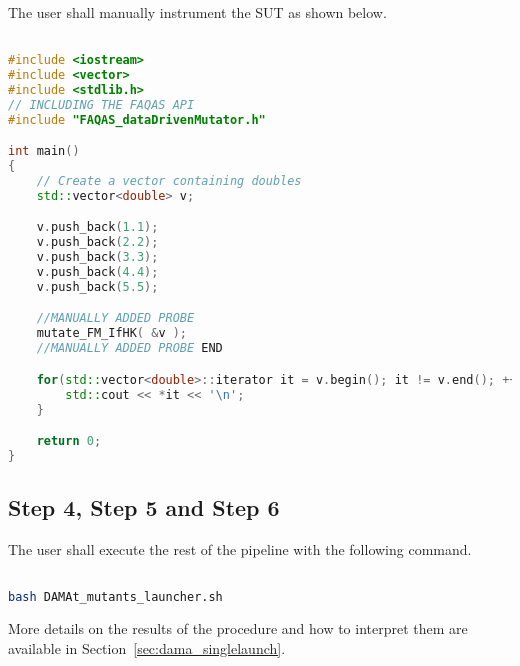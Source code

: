 The user shall manually instrument the SUT as shown below.
\begin{lstlisting}[language=c++]

#include <iostream>
#include <vector>
#include <stdlib.h>
// INCLUDING THE FAQAS API
#include "FAQAS_dataDrivenMutator.h"

int main()
{
    // Create a vector containing doubles
    std::vector<double> v;

    v.push_back(1.1);
    v.push_back(2.2);
    v.push_back(3.3);
    v.push_back(4.4);
    v.push_back(5.5);

    //MANUALLY ADDED PROBE
    mutate_FM_IfHK( &v );
    //MANUALLY ADDED PROBE END

    for(std::vector<double>::iterator it = v.begin(); it != v.end(); ++it) {
    	std::cout << *it << '\n';
    }

    return 0;
}

\end{lstlisting}


\subsection{Step 4, Step 5 and Step 6}

The user shall execute the rest of the pipeline with
the following command.

\begin{lstlisting}[language=bash]

bash DAMAt_mutants_launcher.sh

\end{lstlisting}

More details on the results of the \DAMA procedure and how to interpret them are available in Section~\ref{sec:dama_singlelaunch}.

